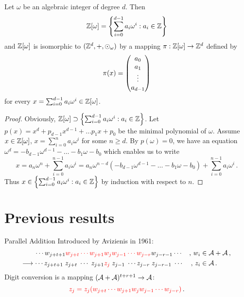\begin{lem}
Let  $\omega$ be an algebraic integer of degree $d$. Then
$$
\mathbb{Z}[\omega] =\left\{\sum_{i=0}^{d-1} a_i \omega^i : a_i\in\mathbb{Z} \right\}
$$ 
and $\mathbb{Z}[\omega]$ is isomorphic to $(\mathbb{Z}^d,+,\odot_\omega)$ by a mapping $\pi:\mathbb{Z}[\omega] \rightarrow \mathbb{Z}^{d}$ defined by 
$$
\pi(x)=\begin{pmatrix} {a}_0 \\ {a}_1 \\ \vdots \\ {a}_{d-1} \end{pmatrix}
$$
 for every $x=\sum_{i=0}^{d-1} a_i \omega^i \in \mathbb{Z}[\omega]$. 
\end{lem}
\begin{proof}
Obviously, $\mathbb{Z}[\omega] \supset \left\{\sum_{i=0}^{d-1} a_i \omega^i : a_i\in\mathbb{Z} \right\}$. Let $p(x)=x^d +p_{d-1}x^{d-1}+ \dots p_1 x+p_0$ be the minimal polynomial of $\omega$. Assume $x\in \mathbb{Z}[\omega]$, $x=\sum_{i=0}^n a_i \omega^i$ for some $n\geq d$.  By $p(\omega)=0$, we have an equation $\omega^d =-b_{d-1}\omega^{d-1}- \dots -b_1\omega-b_0$ which enables us to write
$$
x=a_n\omega^n + \sum_{i=0}^{n-1} a_i \omega^i=a_n \omega^{n-d}(-b_{d-1}\omega^{d-1}- \dots -b_1\omega-b_0)+ \sum_{i=0}^{n-1} a_i \omega^i\,.
$$
Thus $x\in \left\{\sum_{i=0}^{d-1} a_i \omega^i : a_i\in\mathbb{Z} \right\}$ by  induction with respect to $n$.


\end{proof}


























 \section{Previous results}
 
    {Parallel Addition}
    Introduced by Avizienis in 1961:
  \begin{align*}
    \cdots w_{j+t+1}\textcolor{red}{w_{j+t} \cdots w_{j+1}}& \textcolor{red}{w_j w_{j-1} \cdots w_{j-r}}w_{j-r-1} \cdots &,\, w_i &\in \mathcal{A} + \mathcal{A}\,,    \\
    \longrightarrow \cdots z_{j+t+1}\;z_{j+t} \; \cdots \; z_{j+1} &\textcolor{red}{z_j} \; z_{j-1}\; \cdots z_{j-r}\;z_{j-r-1}\; \cdots &,\, z_i &\in \mathcal{A}\,.
  \end{align*}
  Digit conversion is a mapping $(\mathcal{A}+\mathcal{A})^{t+r+1} \to \mathcal{A}$:%
  $$
    \textcolor{red}{z_j=z_j(w_{j+t} \cdots w_{j+1}w_j w_{j-1} \cdots w_{j-r})}\,.
  $$
  
